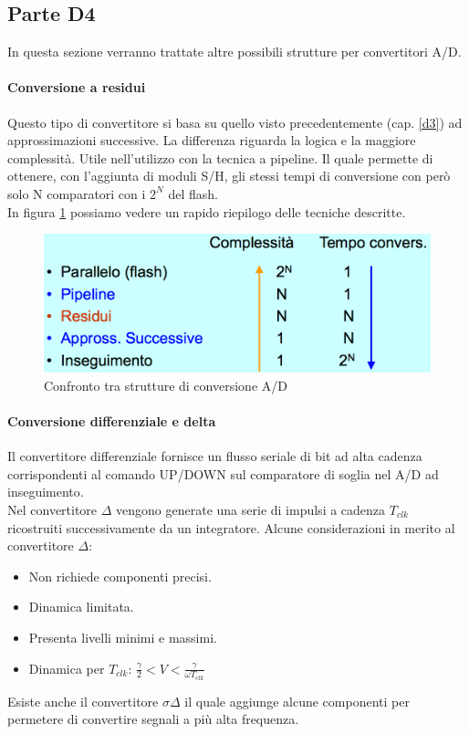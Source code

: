 \documentclass[12pt]{article}
\begin{document}
\subsection{Parte D4}\label{d4}
In questa sezione verranno trattate altre possibili strutture per convertitori A/D.
\paragraph{Conversione a residui} Questo tipo di convertitore si basa su quello visto precedentemente (cap. \ref{d3}) ad approssimazioni successive. La differenza riguarda la logica e la maggiore complessità. Utile nell'utilizzo con la tecnica a pipeline. Il quale permette di ottenere, con l'aggiunta di moduli S/H, gli stessi tempi di conversione con però solo N comparatori con i $2^N$ del flash.\\
In figura \ref{fig:adconfr} possiamo vedere un rapido riepilogo delle tecniche descritte.

\begin{figure}[!hpt]
  \includegraphics[width=\textwidth]{images/adconfr.png}
  \caption{Confronto tra strutture di conversione A/D}
  \label{fig:adconfr}
\end{figure}

\paragraph{Conversione differenziale e delta} %
Il convertitore differenziale fornisce un flusso seriale di bit ad alta cadenza corrispondenti al comando UP/DOWN sul comparatore di soglia nel A/D ad inseguimento.\\
Nel convertitore $\Delta$ vengono generate una serie di impulsi a cadenza $T_{clk}$ ricostruiti successivamente da un integratore. Alcune considerazioni in merito al convertitore $\Delta$:
\begin{itemize}
  \item Non richiede componenti precisi.
  \item Dinamica limitata.
  \item Presenta livelli minimi e massimi.
  \item Dinamica per $T_{clk}$: $\frac{\gamma}{2}<V<\frac{\gamma}{\omega T_{clk}}$
\end{itemize}
Esiste anche il convertitore $\sigma \Delta$ il quale aggiunge alcune componenti per permetere di convertire segnali a più alta frequenza.
\end{document}
